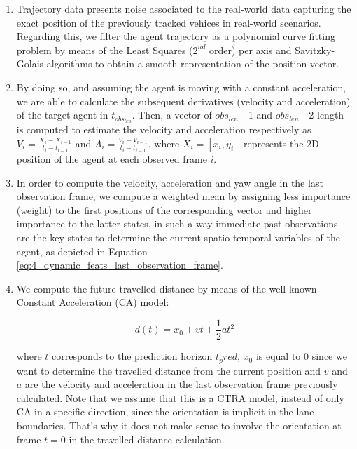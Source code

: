 \begin{enumerate}
	\item Trajectory data presents noise associated to the real-world data capturing the exact position of the previously tracked vehices in real-world scenarios. Regarding this, we filter the agent trajectory as a polynomial curve fitting problem by means of the Least Squares ($2^{nd}$ order) per axis and Savitzky-Golais \cite{savitzky1964smoothing} algorithms to obtain a smooth representation of the position vector.
	
	\item By doing so, and assuming the agent is moving with a constant acceleration, we are able to calculate the subsequent derivatives (velocity and acceleration) of the target agent in $t_{obs_{len}}$. Then, a vector of $obs_{len}$ - 1 and $obs_{len}$ - 2 length is computed to estimate the velocity and acceleration respectively as $V_{i}=\frac{X_{i}-X_{i-1}}{t_{i}-t_{i-1}}$ and $A_{i}=\frac{V_{i}-V_{i-1}}{t_{i}-t_{i-1}}$, where $X_{i}={[x_{i},y_{i}]}$ represents the 2D position of the agent at each observed frame $i$.
	
	\item In order to compute the velocity, acceleration and yaw angle in the last observation frame, we compute a weighted mean by assigning less importance (weight) to the first positions of the corresponding vector and higher importance to the latter states, in such a way immediate past observations are the key states to determine the current spatio-temporal variables of the agent, as depicted in Equation \ref{eq:4_dynamic_feats_last_observation_frame}.
	
	\item We compute the future travelled distance by means of the well-known Constant Acceleration (CA) model:
	
	\begin{equation}
		d(t) = x_0 + vt + \frac{1}{2}at^2
	\end{equation}

	where $t$ corresponds to the prediction horizon $t_pred$, $x_0$ is equal to $0$ since we want to determine the travelled distance from the current position and $v$ and $a$ are the velocity and acceleration in the last observation frame previously calculated. Note that we assume that this is a \ac{CTRA} model, instead of only \ac{CA} in a specific direction, since the orientation is implicit in the lane boundaries. That's why it does not make sense to involve the orientation at frame $t=0$ in the travelled distance calculation.
	

\end{enumerate}
